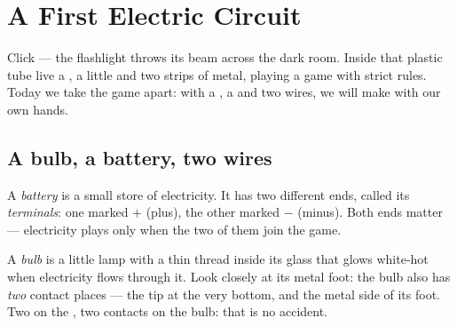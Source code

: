 \chapter{A First Electric Circuit}\label{ch:g3:first-electric-circuit}

Click --- the flashlight throws its beam across the dark room. Inside
that plastic tube live a , a little  and two strips of
metal, playing a game with strict rules. Today we take the game
apart: with a , a  and two wires, we will make  with
our own hands.

\section{A bulb, a battery, two wires}

\begin{definition}\label{def:g3:first-electric-circuit:battery}
A \emph{battery} is a small store of electricity. It
has two different ends, called its
\emph{terminals}: one marked $+$ (plus), the other
marked $-$ (minus). Both ends matter --- electricity plays only when
the two of them join the game.
\end{definition}

\begin{definition}\label{def:g3:first-electric-circuit:bulb}
A \emph{bulb} is a little lamp with a thin thread inside
its glass that glows white-hot when electricity flows through it.
Look closely at its metal foot: the bulb also has \emph{two}
contact places --- the tip at the very bottom, and the metal side of
its foot. Two  on the , two contacts on the bulb:
that is no accident.
\end{definition}

